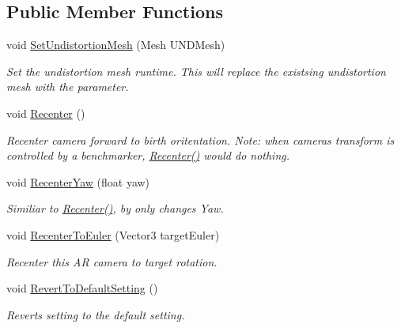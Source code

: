 \subsection*{Public Member Functions}
\begin{DoxyCompactItemize}
\item 
void \mbox{\hyperlink{class_ximmerse_1_1_slide_in_s_d_k_1_1_a_r_camera_ad0d4386e481da240eeb50810ca64566e}{Set\+Undistortion\+Mesh}} (Mesh U\+N\+D\+Mesh)
\begin{DoxyCompactList}\small\item\em Set the undistortion mesh runtime. This will replace the existsing undistortion mesh with the parameter. \end{DoxyCompactList}\item 
void \mbox{\hyperlink{class_ximmerse_1_1_slide_in_s_d_k_1_1_a_r_camera_a145ca3909076668b5d1e273b4efdbc19}{Recenter}} ()
\begin{DoxyCompactList}\small\item\em Recenter camera forward to birth oritentation. Note\+: when camera\textquotesingle{}s transform is controlled by a benchmarker, \mbox{\hyperlink{class_ximmerse_1_1_slide_in_s_d_k_1_1_a_r_camera_a145ca3909076668b5d1e273b4efdbc19}{Recenter()}} would do nothing. \end{DoxyCompactList}\item 
void \mbox{\hyperlink{class_ximmerse_1_1_slide_in_s_d_k_1_1_a_r_camera_aa249201efe4b3fd48d51e7e66d48b167}{Recenter\+Yaw}} (float yaw)
\begin{DoxyCompactList}\small\item\em Similiar to \mbox{\hyperlink{class_ximmerse_1_1_slide_in_s_d_k_1_1_a_r_camera_a145ca3909076668b5d1e273b4efdbc19}{Recenter()}}, by only change\textquotesingle{}s Yaw. \end{DoxyCompactList}\item 
void \mbox{\hyperlink{class_ximmerse_1_1_slide_in_s_d_k_1_1_a_r_camera_ae33579df6b8710e4017106c75a14d831}{Recenter\+To\+Euler}} (Vector3 target\+Euler)
\begin{DoxyCompactList}\small\item\em Recenter this AR camera to target rotation. \end{DoxyCompactList}\item 
void \mbox{\hyperlink{class_ximmerse_1_1_slide_in_s_d_k_1_1_a_r_camera_ae614f2a21ed79323fcbc91c1c4e38d08}{Revert\+To\+Default\+Setting}} ()
\begin{DoxyCompactList}\small\item\em Reverts setting to the default setting. \end{DoxyCompactList}\end{DoxyCompactItemize}
